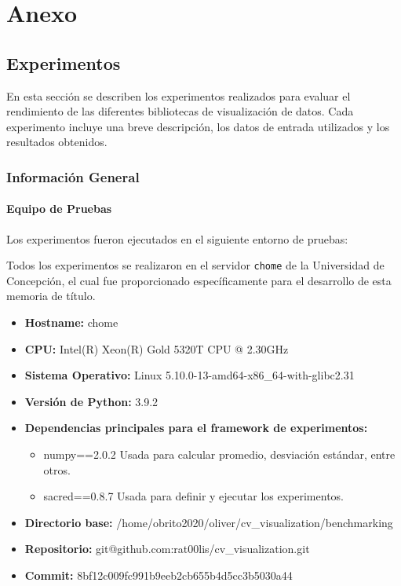 \section{Anexo}

\subsection{Experimentos}
\label{sec:experimentos}




En esta sección se describen los experimentos realizados para evaluar el rendimiento de las diferentes bibliotecas de visualización de datos. Cada experimento incluye una breve descripción, los datos de entrada utilizados y los resultados obtenidos.

\subsubsection{Información General}
\label{general_info}

\paragraph{Equipo de Pruebas}
Los experimentos fueron ejecutados en el siguiente entorno de pruebas:

Todos los experimentos se realizaron en el servidor \texttt{chome} de la Universidad de Concepción, el cual fue proporcionado específicamente para el desarrollo de esta memoria de título. 

\begin{itemize}
    \item \textbf{Hostname:} chome
    \item \textbf{CPU:} Intel(R) Xeon(R) Gold 5320T CPU @ 2.30GHz
    \item \textbf{Sistema Operativo:} Linux 5.10.0-13-amd64-x86\_64-with-glibc2.31
    \item \textbf{Versión de Python:} 3.9.2
    \item \textbf{Dependencias principales para el framework de experimentos:}
    \begin{itemize}
        \item numpy==2.0.2
            Usada para calcular promedio, desviación estándar, entre otros.
        \item sacred==0.8.7
            Usada para definir y ejecutar los experimentos.
    \end{itemize}
    \item \textbf{Directorio base:} /home/obrito2020/oliver/cv\_visualization/benchmarking
    \item \textbf{Repositorio:} git@github.com:rat00lis/cv\_visualization.git
    \item \textbf{Commit:} 8bf12c009fc991b9eeb2cb655b4d5cc3b5030a44
\end{itemize}


